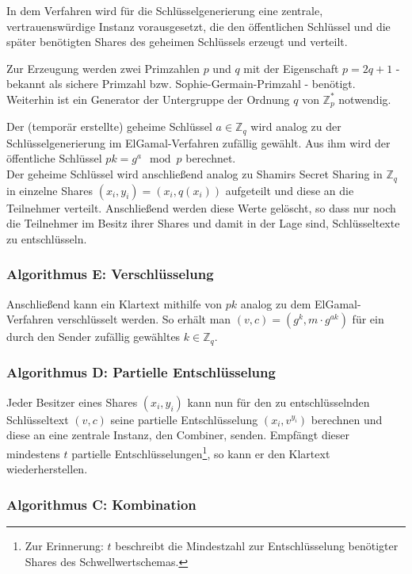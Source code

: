 In dem Verfahren wird für die Schlüsselgenerierung eine zentrale, vertrauenswürdige Instanz vorausgesetzt, die den öffentlichen Schlüssel und die später benötigten Shares des geheimen Schlüssels erzeugt und verteilt. 

Zur Erzeugung werden zwei Primzahlen \(p\) und \(q\) mit der Eigenschaft \(p = 2q + 1\) - bekannt als sichere Primzahl bzw. Sophie-Germain-Primzahl - benötigt. Weiterhin ist ein Generator der Untergruppe der Ordnung \(q\) von \(\mathbb{Z}_p^*\) notwendig.

Der (temporär erstellte) geheime Schlüssel \(a \in \mathbb{Z}_q\) wird analog zu der Schlüsselgenerierung im ElGamal-Verfahren zufällig gewählt. Aus ihm wird der öffentliche Schlüssel \(pk = g^a \mod p\) berechnet.\\
Der geheime Schlüssel wird anschließend analog zu Shamirs Secret Sharing in \(\mathbb{Z}_q\) in einzelne Shares \((x_i, y_i) = (x_i, q(x_i))\) aufgeteilt und diese an die Teilnehmer verteilt. Anschließend werden diese Werte gelöscht, so dass nur noch die Teilnehmer im Besitz ihrer Shares und damit in der Lage sind, Schlüsseltexte zu entschlüsseln.

\subsubsection*{Algorithmus E: Verschlüsselung}

Anschließend kann ein Klartext mithilfe von \(pk\) analog zu dem ElGamal-Verfahren 
verschlüsselt werden. So erhält man \((v,c) = (g^k, m \cdot g^{ak})\) für ein durch den Sender zufällig gewähltes \(k \in \mathbb{Z}_q\).

\subsubsection*{Algorithmus D: Partielle Entschlüsselung}

Jeder Besitzer eines Shares \((x_i, y_i)\) kann nun für den zu entschlüsselnden Schlüsseltext \((v,c)\) seine partielle Entschlüsselung \((x_i, v^{y_i})\) berechnen und diese an eine zentrale Instanz, den Combiner, senden. Empfängt dieser mindestens \(t\) partielle Entschlüsselungen\footnote{
  Zur Erinnerung: \(t\) beschreibt die Mindestzahl zur Entschlüsselung benötigter Shares des Schwellwertschemas.
}, so kann er den Klartext wiederherstellen.

\subsubsection*{Algorithmus C: Kombination}

